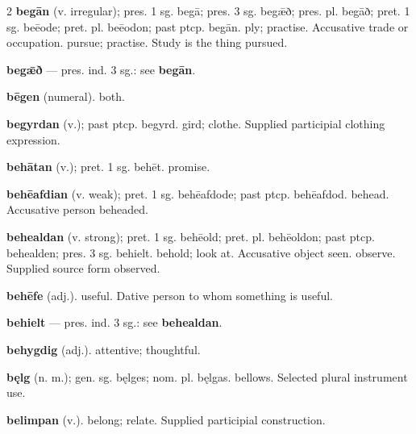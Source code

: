 \begin{multicols*}{2}
\textbf{begān} (v. irregular); pres. 1 sg. begā; pres. 3 sg. begǣð; pres. pl. begāð; pret. 1 sg. beēode; pret. pl. beēodon; past ptcp. begān. ply; practise. Accusative trade or occupation. pursue; practise. Study is the thing pursued.\par
\textbf{begǣð} — pres. ind. 3 sg.: see \textbf{begān}.\par
\textbf{bēgen} (numeral). both.\par
\textbf{begyrdan} (v.); past ptcp. begyrd. gird; clothe. Supplied participial clothing expression.\par
\textbf{behātan} (v.); pret. 1 sg. behēt. promise.\par
\textbf{behēafdian} (v. weak); pret. 1 sg. behēafdode; past ptcp. behēafdod. behead. Accusative person beheaded.\par
\textbf{behealdan} (v. strong); pret. 1 sg. behēold; pret. pl. behēoldon; past ptcp. behealden; pres. 3 sg. behielt. behold; look at. Accusative object seen. observe. Supplied source form observed.\par
\textbf{behēfe} (adj.). useful. Dative person to whom something is useful.\par
\textbf{behielt} — pres. ind. 3 sg.: see \textbf{behealdan}.\par
\textbf{behygdig} (adj.). attentive; thoughtful.\par
\textbf{bęlg} (n. m.); gen. sg. bęlges; nom. pl. bęlgas. bellows. Selected plural instrument use.\par
\textbf{belimpan} (v.). belong; relate. Supplied participial construction.\par

\end{multicols*}
